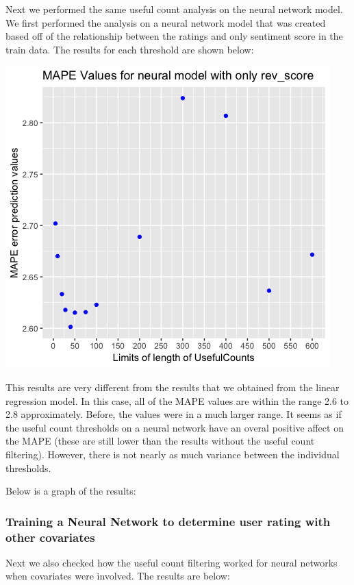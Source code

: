 \documentclass{article}
\begin{document}
    Next we performed the same useful count analysis on the neural network model. We first performed the analysis on a neural network model that was created based off of the relationship between the ratings and only sentiment score in the train data. The results for each threshold are shown below:
  
   \includegraphics[scale = 0.8]{DNS_filter.png}  
 
 This results are very different from the results that we obtained from the linear regression model. In this case, all of the MAPE values are within the range 2.6 to 2.8 approximately. Before, the values were in a much larger range. It seems as if the useful count thresholds on a neural network have an overal positive affect on the MAPE (these are still lower than the results without the useful count filtering). However, there is not nearly as much variance between the individual thresholds.
 
 Below is a graph of the results: 
 

 
\subsubsection{Training a Neural Network to determine user rating with other covariates}

Next we also checked how the useful count filtering worked for neural networks when covariates were involved. The results are below:
\end{document}
